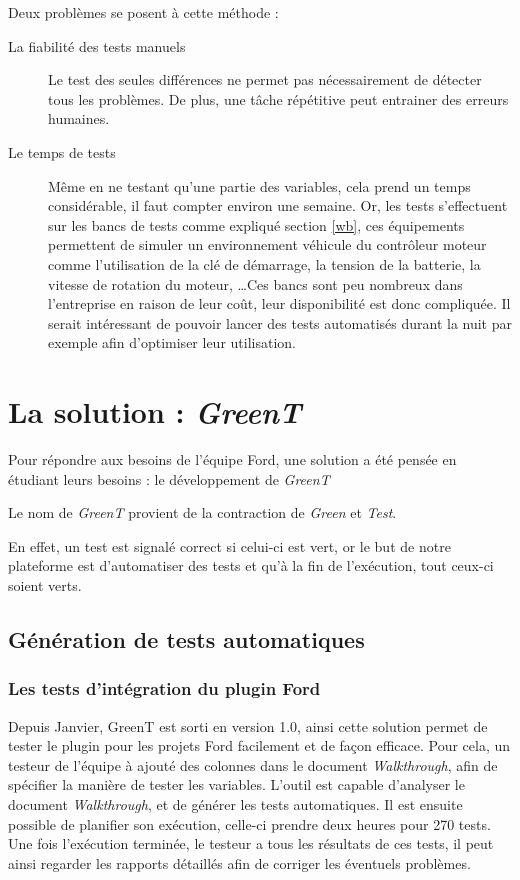 	\vspace{20px}
	Deux problèmes se posent à cette méthode : 
	\begin{description}
		\item[La fiabilité des tests manuels] Le test des seules différences ne permet pas nécessairement de détecter tous les problèmes. De plus, une tâche répétitive peut entrainer des erreurs humaines.
		\item[Le temps de tests] Même en ne testant qu'une partie des variables, cela prend un temps considérable, il faut compter environ une semaine.\newline
			Or, les tests s'effectuent sur les bancs de tests comme expliqué section \ref{wb}, ces équipements permettent de simuler un environnement véhicule du contrôleur moteur comme
			l'utilisation de la clé de démarrage, la tension de la batterie, la vitesse de rotation du moteur, \ldots Ces bancs sont peu
			nombreux dans l'entreprise en raison de leur coût, leur disponibilité est donc compliquée. Il serait intéressant de pouvoir lancer
			des tests automatisés durant la nuit par exemple afin d'optimiser leur utilisation.
	\end{description}
	
\newpage
	\section{La solution : \textit{GreenT}}
	Pour répondre aux besoins de l'équipe Ford, une solution a été pensée en étudiant leurs besoins : le développement de \textit{GreenT}
	\begin{remarque}
		Le nom de \textit{GreenT} provient de la contraction de \textit{Green} et \textit{Test}.
		
		En effet, un test est signalé correct si celui-ci est vert, or le but de notre plateforme est d'automatiser des tests et qu'à la fin de l'exécution, tout ceux-ci soient verts.
	\end{remarque}
	
	\subsection{Génération de tests automatiques}
	\subsubsection{Les tests d'intégration du plugin Ford}
		Depuis Janvier, GreenT est sorti en version 1.0, ainsi cette solution permet de tester le plugin pour les projets Ford facilement et de façon efficace. Pour cela, un testeur de l'équipe à ajouté des colonnes dans le document \textit{Walkthrough}, afin de spécifier la manière de tester les variables. L'outil est capable d'analyser le document \textit{Walkthrough}, et de générer les tests automatiques. Il est ensuite possible de planifier son exécution, celle-ci prendre deux heures pour 270 tests. Une fois l'exécution terminée, le testeur a tous les résultats de ces tests, il peut ainsi regarder les rapports détaillés afin de corriger les éventuels problèmes.
	
